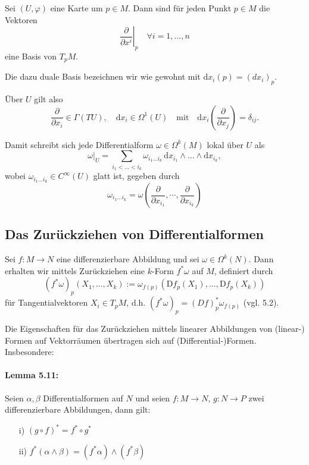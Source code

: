 \documentclass[fleqn, 12pt, letterpaper]{article}
\newcommand{\deldel}[2]{\frac{\partial #1}{\partial #2}}
\begin{document}
Sei \( (U, \varphi) \) eine Karte um \( p \in M \). Dann sind für jeden Punkt \( p \in M \) die Vektoren 
\[
\left. \frac{\partial}{\partial x^i} \right|_p \quad \forall i = 1, \dots, n
\]
eine Basis von \( T_p M \).

Die dazu duale Basis bezeichnen wir wie gewohnt mit \( \mathrm{d}x_i(p)=(dx_i)_p \).

Über \( U \) gilt also
\[
\frac{\partial}{\partial x_i} \in \Gamma(TU), \quad \mathrm{d}x_i \in \Omega^1(U) \quad \text{mit} \quad \mathrm{d}x_i\left( \frac{\partial}{\partial x_j} \right) = \delta_{ij}.
\]

Damit schreibt sich jede Differentialform \( \omega \in \Omega^k(M) \) lokal über \( U \) als
\[
\omega|_U = \sum_{i_1 < \dots < i_k} \omega_{i_1 \dots i_k} \, \mathrm{d}x_{i_1} \wedge \dots \wedge \mathrm{d}x_{i_k},
\]
wobei \( \omega_{i_1 \dots i_k} \in C^\infty(U) \) glatt ist, gegeben durch
\[
\omega_{i_1 \dots i_k} = \omega(\deldel{}{x_{i_1}},\cdots, \deldel{}{x_{i_k}})
\]
\subsection{Das Zurückziehen von Differentialformen}

Sei \( f : M \to N \) eine differenzierbare Abbildung und sei \( \omega \in \Omega^k(N) \). Dann erhalten wir mittels Zurückziehen eine \( k \)-Form \( f^*\omega \) auf \( M \), definiert durch
\[
(f^*\omega)_p(X_1, \dots, X_k) := \omega_{f(p)} \left( \mathrm{D}f_p(X_1), \dots, \mathrm{D}f_p(X_k) \right)
\]
für Tangentialvektoren \( X_i \in T_p M \), d.h. \( (f^*\omega)_p = (Df)^*_p\omega_{f(p)}\) (vgl. 5.2).

Die Eigenschaften für das Zurückziehen mittels linearer Abbildungen von (linear-) Formen auf Vektorräumen übertragen sich auf (Differential-)Formen. Insbesondere:

\paragraph{Lemma 5.11:} 
Seien \( \alpha, \beta \) Differentialformen auf \( N \) und seien \( f : M \to N \), \( g : N \to P \) zwei differenzierbare Abbildungen, dann gilt:
\begin{itemize}
    \item[i)] \( (g \circ f)^* = f^* \circ g^* \)
    \item[ii)] \( f^*(\alpha \wedge \beta) = (f^*\alpha) \wedge (f^*\beta) \)
\end{itemize}
\end{document}
